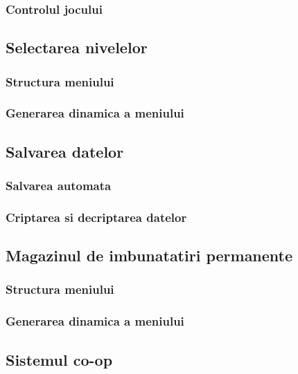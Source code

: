 \documentclass[12pt, a4paper]{article}
\begin{document}
	\subsubsection{Controlul jocului}
	\label{section: gameState}
	
	
	
	\subsection{Selectarea nivelelor}
	\label{section: levelSelection}
	
	\subsubsection{Structura meniului}
	
	\subsubsection{Generarea dinamica a meniului}
	
	
	\subsection{Salvarea datelor}
	
	\subsubsection{Salvarea automata}
	
	\subsubsection{Criptarea si decriptarea datelor}
	
	
	\subsection{Magazinul de imbunatatiri permanente}
	\label{section: permanentUpgrade}
	
	\subsubsection{Structura meniului}
	
	\subsubsection{Generarea dinamica a meniului}
	
	
	\subsection{Sistemul co-op}
	\label{section: coop}
	
\end{document}
